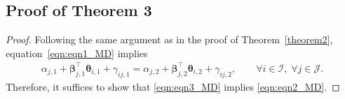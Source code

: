 \documentclass[11pt]{article}
\begin{document}
\subsection{Proof of Theorem 3}\label{Appen_A.3}
\begin{proof}
Following the same argument as in the proof of Theorem~\ref{theorem2}, 
equation~\eqref{eqn:eqn1_MD} implies
\begin{align}\label{eqn:eqn3_MD}
    \alpha_{j,1} + \boldsymbol{\beta}_{j,1}^\top \boldsymbol{\theta}_{i,1} + \gamma_{ij,1}
    =
    \alpha_{j,2} + \boldsymbol{\beta}_{j,2}^\top \boldsymbol{\theta}_{i,2} + \gamma_{ij,2},
    \qquad 
    \forall i\in\mathcal{I},\; \forall j\in\mathcal{J}.
\end{align}
Therefore, it suffices to show that \eqref{eqn:eqn3_MD} implies \eqref{eqn:eqn2_MD}.


\end{proof}
\end{document}
